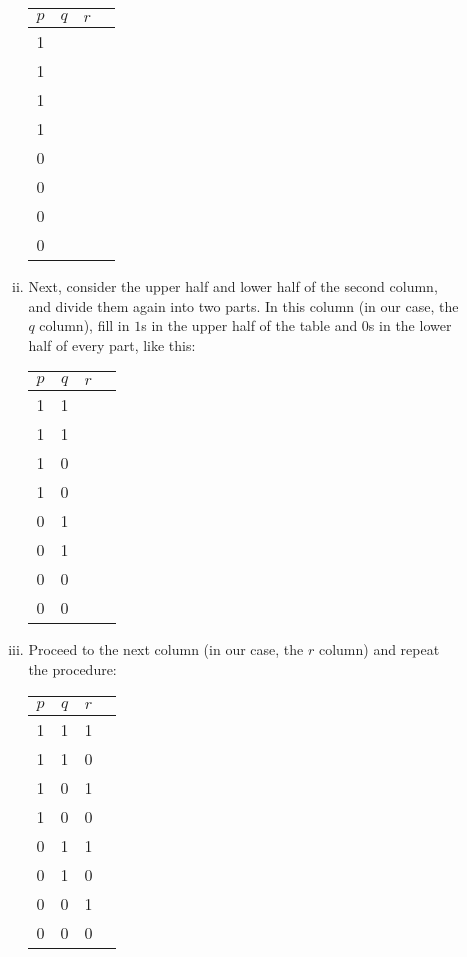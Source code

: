 \begin{enumerate}[\thesection.1]
\begin{enumerate}
\begin{enumerate}[(i)]
\begin{center}
\begin{tabular}{c | c | c | c}
$p$ & $q$ & $r$  &\hspace*{40ex} \\\hline
1& & & \\\hline
1& & & \\\hline
1& & & \\\hline
1& & & \\\hline
0& & & \\\hline
0& & & \\\hline
0& & & \\\hline
0& & & \\

\end{tabular}
\end{center}

\item Next, consider the upper half and lower half of the second column, and divide them again into two parts. In this column (in our case, the $q$ column), fill in $1$s in the upper half of the table and $0$s in the lower half of every part, like this:

\begin{center}
\begin{tabular}{c | c | c | c}
$p$ & $q$ & $r$  &\hspace*{40ex} \\\hline
1& 1& & \\\hline
1& 1& & \\\hline
1& 0& & \\\hline
1& 0& & \\\hline
0& 1& & \\\hline
0& 1& & \\\hline
0& 0& & \\\hline
0& 0& & \\

\end{tabular}
\end{center}

\item Proceed to the next column (in our case, the $r$ column) and repeat the procedure:

\begin{center}
\begin{tabular}{c | c | c | c}
$p$ & $q$ & $r$  &\hspace*{40ex} \\\hline
1& 1& 1& \\\hline
1& 1& 0 & \\\hline
1& 0& 1& \\\hline
1& 0& 0& \\\hline
0& 1& 1& \\\hline
0& 1& 0& \\\hline
0& 0& 1& \\\hline
0& 0& 0& \\


\end{tabular}
\end{center}
\end{enumerate}
\end{enumerate}
\end{enumerate}
